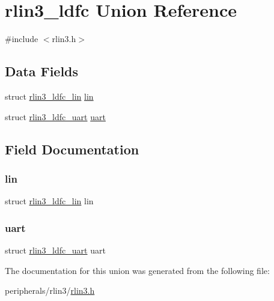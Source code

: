 \hypertarget{unionrlin3__ldfc}{}\section{rlin3\+\_\+ldfc Union Reference}
\label{unionrlin3__ldfc}


{\ttfamily \#include $<$rlin3.\+h$>$}

\subsection*{Data Fields}
\begin{DoxyCompactItemize}
\item 
struct \mbox{\hyperlink{structrlin3__ldfc__lin}{rlin3\+\_\+ldfc\+\_\+lin}} \mbox{\hyperlink{unionrlin3__ldfc_a239790ba3758f414e721dff149140804}{lin}}
\item 
struct \mbox{\hyperlink{structrlin3__ldfc__uart}{rlin3\+\_\+ldfc\+\_\+uart}} \mbox{\hyperlink{unionrlin3__ldfc_a487cc976c05854483e5ee0cef6f91977}{uart}}
\end{DoxyCompactItemize}


\subsection{Field Documentation}
\mbox{\label{unionrlin3__ldfc_a239790ba3758f414e721dff149140804}} 
\subsubsection{\texorpdfstring{lin}{lin}}
{\footnotesize\ttfamily struct \mbox{\hyperlink{structrlin3__ldfc__lin}{rlin3\+\_\+ldfc\+\_\+lin}} lin}

\mbox{\label{unionrlin3__ldfc_a487cc976c05854483e5ee0cef6f91977}} 
\subsubsection{\texorpdfstring{uart}{uart}}
{\footnotesize\ttfamily struct \mbox{\hyperlink{structrlin3__ldfc__uart}{rlin3\+\_\+ldfc\+\_\+uart}} uart}



The documentation for this union was generated from the following file\+:\begin{DoxyCompactItemize}
\item 
peripherals/rlin3/\mbox{\hyperlink{rlin3_8h}{rlin3.\+h}}\end{DoxyCompactItemize}
